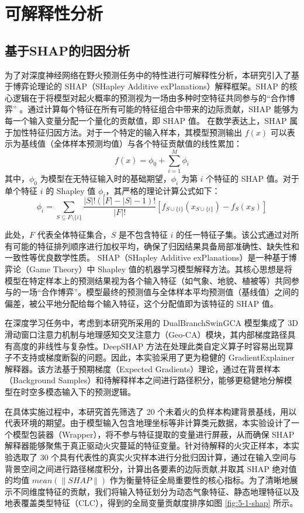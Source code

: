 \chapter{可解释性分析}
\label{chap:5}

\section{基于SHAP的归因分析}
为了对深度神经网络在野火预测任务中的特性进行可解释性分析，本研究引入了基于博弈论理论的 SHAP（SHapley Additive exPlanations）解释框架。SHAP 的核心逻辑在于将模型对起火概率的预测视为一场由多种时空特征共同参与的“合作博弈” 。通过计算每个特征在所有可能的特征组合中带来的边际贡献，SHAP 能够为每一个输入变量分配一个量化的贡献值，即 SHAP 值。  
在数学表达上，SHAP 属于加性特征归因方法。对于一个特定的输入样本，其模型预测输出 $f(x)$ 可以表示为基线值（全体样本预测均值）与各个特征贡献值的线性累加：
\begin{equation}
     f(x) = \phi_0 + \sum_{i=1}^{M} \phi_i 
\end{equation}
其中，$\phi_0$ 为模型在无特征输入时的基础期望，$\phi_i$ 为第 $i$ 个特征的 SHAP 值。对于单个特征 $i$ 的 Shapley 值 $\phi_i$，其严格的理论计算公式如下：
\begin{equation}
    \phi_i = \sum_{S \subseteq F \setminus \{i\}} \frac{|S|!(|F| - |S| - 1)!}{|F|!} [f_{S \cup \{i\}}(x_{S \cup \{i\}}) - f_S(x_S)] 
\end{equation}

此处，$F$ 代表全体特征集合，$S$ 是不包含特征 $i$ 的任一特征子集。该公式通过对所有可能的特征排列顺序进行加权平均，确保了归因结果具备局部准确性、缺失性和一致性等优良数学性质。
SHAP（SHapley Additive exPlanations）是一种基于博弈论（Game Theory）中 Shapley 值的机器学习模型解释方法。其核心思想是将模型在特定样本上的预测结果视为各个输入特征（如气象、地貌、植被等）共同参与的一场“合作博弈”。模型最终的预测值与全体样本平均预测值（基线值）之间的偏差，被公平地分配给每个输入特征，这个分配值即为该特征的 SHAP 值。

在深度学习任务中，考虑到本研究所采用的 DualBranchSwinGCA 模型集成了 3D 滑动窗口注意力机制与地理感知交叉注意力（Geo-CA）模块，其内部梯度路径具有高度的非线性与复杂性。DeepSHAP 方法在处理此类自定义算子时容易出现算子不支持或梯度断裂的问题。因此，本实验采用了更为稳健的 GradientExplainer 解释器。该方法基于预期梯度（Expected Gradients）理论，通过在背景样本（Background Samples）和待解释样本之间进行路径积分，能够更稳健地分解模型在时空多模态输入下的预测逻辑。

在具体实施过程中，本研究首先筛选了 20 个未着火的负样本构建背景基线，用以代表环境的期望。由于模型输入包含地理坐标等非计算类元数据，本实验设计了一个模型包装器（Wrapper），将不参与特征提取的变量进行屏蔽，从而确保 SHAP 解释器能够聚焦于真正驱动火灾蔓延的特征变量。针对待解释的火灾正样本，本实验选取了 30 个具有代表性的真实火灾样本进行分批归因计算，通过在输入空间与背景空间之间进行路径梯度积分，计算出各要素的边际贡献,并取其 SHAP 绝对值的均值 $mean(\|SHAP\|)$ 作为衡量特征全局重要性的核心指标。为了清晰地展示不同维度特征的贡献，我们将输入特征划分为动态气象特征、静态地理特征以及地表覆盖类型特征（CLC），得到的全局变量贡献度排序如图 \ref{fig:5-1-shap} 所示。


